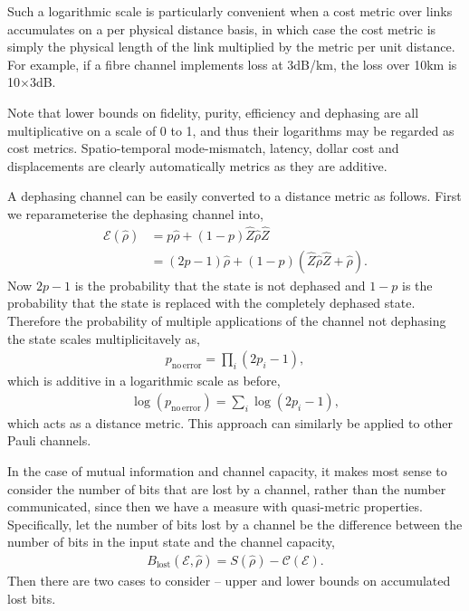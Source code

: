 Such a logarithmic scale is particularly convenient when a cost metric over links accumulates on a per physical distance basis, in which case the cost metric is simply the physical length of the link multiplied by the metric per unit distance. For example, if a fibre channel implements loss at 3dB/km, the loss over 10km is 10$\times$3dB.

Note that lower bounds on fidelity, purity, efficiency and dephasing are all multiplicative on a scale of 0 to 1, and thus their logarithms may be regarded as cost metrics. Spatio-temporal mode-mismatch, latency, dollar cost and displacements are clearly automatically metrics as they are additive.

A dephasing channel can be easily converted to a distance metric as follows. First we reparameterise the dephasing channel into,
\begin{align}
\mathcal{E}(\hat\rho) &= p\hat\rho + (1-p)\hat{Z}\hat\rho\hat{Z}\nonumber\\
&= (2p-1)\hat\rho + (1-p)(\hat{Z}\hat\rho\hat{Z} + \hat\rho).	
\end{align}
Now \mbox{$2p-1$} is the probability that the state is not dephased and \mbox{$1-p$} is the probability that the state is replaced with the completely dephased state. Therefore the probability of multiple applications of the channel not dephasing the state scales multiplicitavely as,
\begin{align}
p_\mathrm{no\, error} = \prod_{i}(2p_i-1),
\end{align}
which is additive in a logarithmic scale as before,
\begin{align}
\log(p_\mathrm{no\, error}) = \sum_i \log(2p_i-1),
\end{align}
which acts as a distance metric. This approach can similarly be applied to other Pauli channels.


In the case of mutual information and channel capacity, it makes most sense to consider the number of bits that are lost by a channel, rather than the number communicated, since then we have a measure with quasi-metric properties. Specifically, let the number of bits lost by a channel be the difference between the number of bits in the input state and the channel capacity,
\begin{align}
B_\mathrm{lost}(\mathcal{E},\hat\rho) = S(\hat\rho) - \mathcal{C}(\mathcal{E}).
\end{align}
Then there are two cases to consider -- upper and lower bounds on accumulated lost bits.

